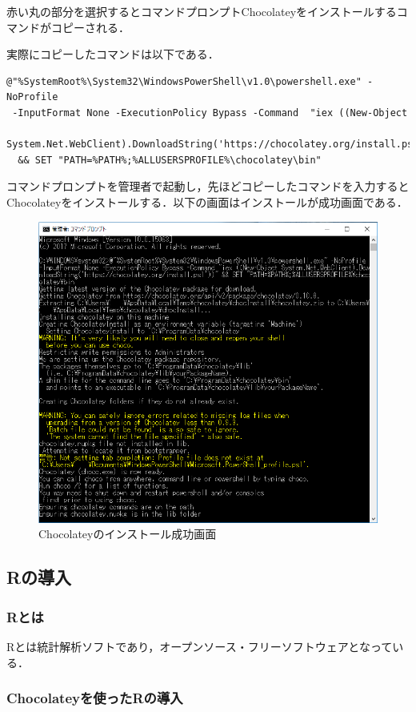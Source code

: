 赤い丸の部分を選択するとコマンドプロンプトChocolateyをインストールするコマンドがコピーされる．

実際にコピーしたコマンドは以下である．

\begin{verbatim}
@"%SystemRoot%\System32\WindowsPowerShell\v1.0\powershell.exe" -NoProfile
 -InputFormat None -ExecutionPolicy Bypass -Command  "iex ((New-Object
  System.Net.WebClient).DownloadString('https://chocolatey.org/install.ps1'))" 
  && SET "PATH=%PATH%;%ALLUSERSPROFILE%\chocolatey\bin"
\end{verbatim}
\newpage
コマンドプロンプトを管理者で起動し，先ほどコピーしたコマンドを入力するとChocolateyをインストールする．以下の画面はインストールが成功画面である．

\begin{figure}[h]
\centering
\includegraphics[width=13cm,clip]{chocolateyinst.PNG}
\caption{Chocolateyのインストール成功画面}
\end{figure}
\newpage
\subsection{Rの導入}
\subsubsection{Rとは}
Rとは統計解析ソフトであり，オープンソース・フリーソフトウェアとなっている．
\subsubsection{Chocolateyを使ったRの導入}



